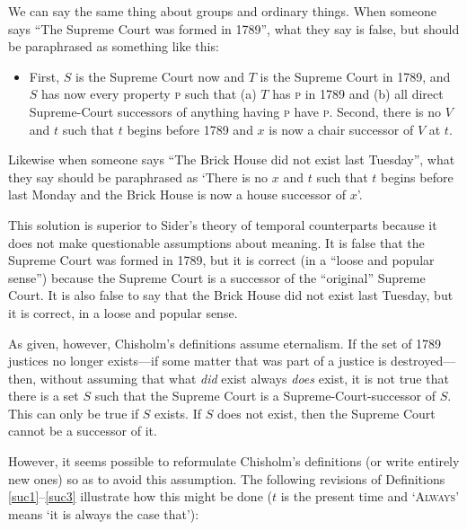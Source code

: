 \documentclass[11pt]{article}
\begin{document}
\begin{spacing}{1.5}
We can say the same thing about groups and ordinary things.  When
someone says ``The Supreme Court was formed in 1789'', what they say
is false, but should be paraphrased as something like this:

\begin{itemize}
  \item First, $S$ is the Supreme Court now and $T$ is the Supreme
    Court in 1789, and $S$ has now every property \textsc{p} such that
    (a) $T$ has \textsc{p} in 1789 and (b) all direct Supreme-Court
    successors of anything having \textsc{p} have \textsc{p}.  Second,
    there is no $V$ and $t$ such that $t$ begins before 1789 and $x$
    is now a chair successor of $V$ at $t$.
\end{itemize}

Likewise when someone says ``The Brick House did not exist last
Tuesday'', what they say should be paraphrased as `There is no $x$ and
$t$ such that $t$ begins before last Monday and the Brick House is now
a house successor of $x$'.

This solution is superior to Sider's theory of temporal counterparts
because it does not make questionable assumptions about meaning.  It
is false that the Supreme Court was formed in 1789, but it is correct
(in a ``loose and popular sense'') because the Supreme Court is a
successor of the ``original'' Supreme Court.  It is also false to say
that the Brick House did not exist last Tuesday, but it is correct, in
a loose and popular sense.

As given, however, Chisholm's definitions assume eternalism.  If the
set of 1789 justices no longer exists---if some matter that was part
of a justice is destroyed---then, without assuming that what {\em did}
exist always {\em does} exist, it is not true that there is a set $S$
such that the Supreme Court is a Supreme-Court-successor of $S$.  This
can only be true if $S$ exists.  If $S$ does not exist, then the
Supreme Court cannot be a successor of it.

However, it seems possible to reformulate Chisholm's definitions (or
write entirely new ones) so as to avoid this assumption.  The
following revisions of Definitions \ref{suc1}--\ref{suc3} illustrate
how this might be done ($t$ is the present time and `\textsc{Always}'
means `it is always the case that'):


\end{spacing}
\end{document}
